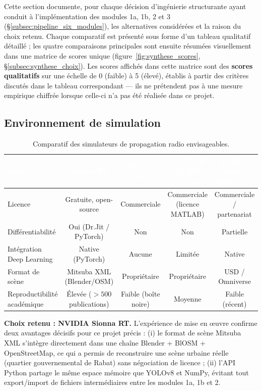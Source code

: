 \documentclass[12pt,a4paper,titlepage]{article}
\newcommand{\hd}[1]{\textcolor{white}{\textbf{#1}}}
\begin{document}
Cette section documente, pour chaque décision d'ingénierie structurante ayant conduit à l'implémentation des modules 1a, 1b, 2 et 3 (\S\ref{subsec:pipeline_six_modules}), les alternatives considérées et la raison du choix retenu. Chaque comparatif est présenté sous forme d'un tableau qualitatif détaillé ; les quatre comparaisons principales sont ensuite résumées visuellement dans une matrice de scores unique (figure~\ref{fig:synthese_scores}, \S\ref{subsec:synthese_choix}). Les scores affichés dans cette matrice sont des \textbf{scores qualitatifs} sur une échelle de 0 (faible) à 5 (élevé), établis à partir des critères discutés dans le tableau correspondant --- ils ne prétendent pas à une mesure empirique chiffrée lorsque celle-ci n'a pas été réalisée dans ce projet.

\subsection{Environnement de simulation}
\label{subsec:choix_simulateur}

\begin{table}[H]
    \centering
    \caption{Comparatif des simulateurs de propagation radio envisageables.}
    \begin{tabularx}{\textwidth}{F{3.2cm}CCCC}
        \toprule
        \hd{Critère} & \hd{Sionna RT} & \hd{Wireless InSite} & \hd{MATLAB 5G/RT Toolbox} & \hd{NVIDIA Aerial Omniverse} \\
        \midrule
        Licence & Gratuite, open-source & Commerciale & Commerciale (licence MATLAB) & Commerciale / partenariat \\
        Différentiabilité & Oui (Dr.Jit / PyTorch) & Non & Non & Partielle \\
        Intégration Deep Learning & Native (PyTorch) & Aucune & Limitée & Native \\
        Format de scène & Mitsuba XML (Blender/OSM) & Propriétaire & Propriétaire & USD / Omniverse \\
        Reproductibilité académique & Élevée ($>500$ publications) & Faible (boîte noire) & Moyenne & Faible (récent) \\
        \bottomrule
    \end{tabularx}
\end{table}


\textbf{Choix retenu : NVIDIA Sionna RT.} L'expérience de mise en \oe uvre confirme deux avantages décisifs pour ce projet précis : (i) le format de scène Mitsuba XML s'intègre directement dans une chaîne Blender + BlOSM + OpenStreetMap, ce qui a permis de reconstruire une scène urbaine réelle (quartier gouvernemental de Rabat) sans négociation de licence ; (ii) l'API Python partage le même espace mémoire que YOLOv8 et NumPy, évitant tout export/import de fichiers intermédiaires entre les modules 1a, 1b et 2.
\end{document}
